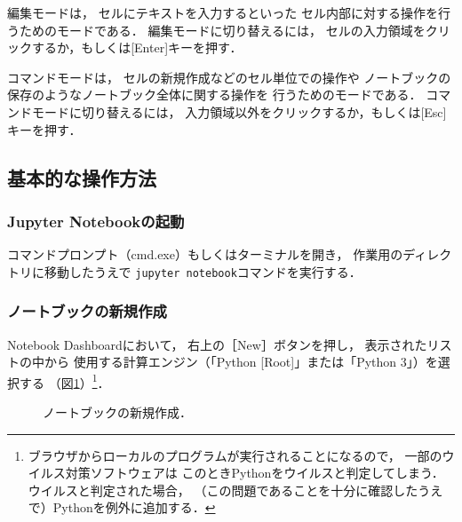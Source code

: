 編集モードは，
セルにテキストを入力するといった
セル内部に対する操作を行うためのモードである．
編集モードに切り替えるには，
セルの入力領域をクリックするか，もしくは[Enter]キーを押す．

コマンドモードは，
セルの新規作成などのセル単位での操作や
ノートブックの保存のようなノートブック全体に関する操作を
行うためのモードである．
コマンドモードに切り替えるには，
入力領域以外をクリックするか，もしくは[Esc]キーを押す．


\subsection{基本的な操作方法}


\subsubsection{Jupyter Notebookの起動}
コマンドプロンプト（cmd.exe）もしくはターミナルを開き，
作業用のディレクトリに移動したうえで
\verb|jupyter notebook|コマンドを実行する．


\subsubsection{ノートブックの新規作成}
Notebook Dashboardにおいて，
右上の［New］ボタンを押し，
表示されたリストの中から
使用する計算エンジン（「Python [Root]」または「Python 3」）を選択する
（図\ref{fig: ノートブックの新規作成}）\footnote{%
ブラウザからローカルのプログラムが実行されることになるので，
一部のウイルス対策ソフトウェアは
このときPythonをウイルスと判定してしまう．
ウイルスと判定された場合，
（この問題であることを十分に確認したうえで）Pythonを例外に追加する．
}．

\begin{figure}[htbp]
\centering
\setlength{\fboxsep}{0pt}
\caption{\label{fig: ノートブックの新規作成}%
ノートブックの新規作成．
}
\end{figure}



